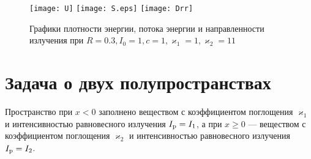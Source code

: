 \begin{figure}[ht!]%
\centering
\texttt{[image: U]}\quad%
\texttt{[image: S.eps]}\quad%
\texttt{[image: Drr]}%
\caption{Графики плотности энергии, потока энергии и направленности излучения при $R = 0.3, I_0 = 1, c = 1, \varkappa_1 = 1, \varkappa_2 = 11$}%
\end{figure}

\section{Задача о двух полупространствах}

Пространство при $x < 0$ заполнено веществом с коэффициентом поглощения $\varkappa_1$ и интенсивностью равновесного излучения $I_\text{p} = I_1$,
а при $x \geq 0$ --- веществом с коэффициентом поглощения $\varkappa_2$ и интенсивностью равновесного излучения $I_\text{p} = I_2$.

